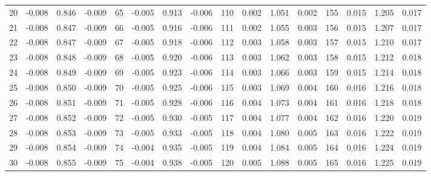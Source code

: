 \begin{table}
{\begin{tabular}{rrrr|rrrr|rrrr|crrr}
 20 & \tiny{ -0.008} &   0.846 & \tiny{ -0.009} &  65 & \tiny{ -0.005} &   0.913 & \tiny{ -0.006} & 110 & \tiny{  0.002} &   1.051 & \tiny{  0.002} & 155 & \tiny{  0.015} &   1.205 & \tiny{  0.017}\\
 21 & \tiny{ -0.008} &   0.847 & \tiny{ -0.009} &  66 & \tiny{ -0.005} &   0.916 & \tiny{ -0.006} & 111 & \tiny{  0.002} &   1.055 & \tiny{  0.003} & 156 & \tiny{  0.015} &   1.207 & \tiny{  0.017}\\
 22 & \tiny{ -0.008} &   0.847 & \tiny{ -0.009} &  67 & \tiny{ -0.005} &   0.918 & \tiny{ -0.006} & 112 & \tiny{  0.003} &   1.058 & \tiny{  0.003} & 157 & \tiny{  0.015} &   1.210 & \tiny{  0.017}\\
 23 & \tiny{ -0.008} &   0.848 & \tiny{ -0.009} &  68 & \tiny{ -0.005} &   0.920 & \tiny{ -0.006} & 113 & \tiny{  0.003} &   1.062 & \tiny{  0.003} & 158 & \tiny{  0.015} &   1.212 & \tiny{  0.018}\\
 24 & \tiny{ -0.008} &   0.849 & \tiny{ -0.009} &  69 & \tiny{ -0.005} &   0.923 & \tiny{ -0.006} & 114 & \tiny{  0.003} &   1.066 & \tiny{  0.003} & 159 & \tiny{  0.015} &   1.214 & \tiny{  0.018}\\
 25 & \tiny{ -0.008} &   0.850 & \tiny{ -0.009} &  70 & \tiny{ -0.005} &   0.925 & \tiny{ -0.006} & 115 & \tiny{  0.003} &   1.069 & \tiny{  0.004} & 160 & \tiny{  0.016} &   1.216 & \tiny{  0.018}\\
 26 & \tiny{ -0.008} &   0.851 & \tiny{ -0.009} &  71 & \tiny{ -0.005} &   0.928 & \tiny{ -0.006} & 116 & \tiny{  0.004} &   1.073 & \tiny{  0.004} & 161 & \tiny{  0.016} &   1.218 & \tiny{  0.018}\\
 27 & \tiny{ -0.008} &   0.852 & \tiny{ -0.009} &  72 & \tiny{ -0.005} &   0.930 & \tiny{ -0.005} & 117 & \tiny{  0.004} &   1.077 & \tiny{  0.004} & 162 & \tiny{  0.016} &   1.220 & \tiny{  0.019}\\
 28 & \tiny{ -0.008} &   0.853 & \tiny{ -0.009} &  73 & \tiny{ -0.005} &   0.933 & \tiny{ -0.005} & 118 & \tiny{  0.004} &   1.080 & \tiny{  0.005} & 163 & \tiny{  0.016} &   1.222 & \tiny{  0.019}\\
 29 & \tiny{ -0.008} &   0.854 & \tiny{ -0.009} &  74 & \tiny{ -0.004} &   0.935 & \tiny{ -0.005} & 119 & \tiny{  0.004} &   1.084 & \tiny{  0.005} & 164 & \tiny{  0.016} &   1.224 & \tiny{  0.019}\\
 30 & \tiny{ -0.008} &   0.855 & \tiny{ -0.009} &  75 & \tiny{ -0.004} &   0.938 & \tiny{ -0.005} & 120 & \tiny{  0.005} &   1.088 & \tiny{  0.005} & 165 & \tiny{  0.016} &   1.225 & \tiny{  0.019}\\

\end{tabular}}
\end{table}
